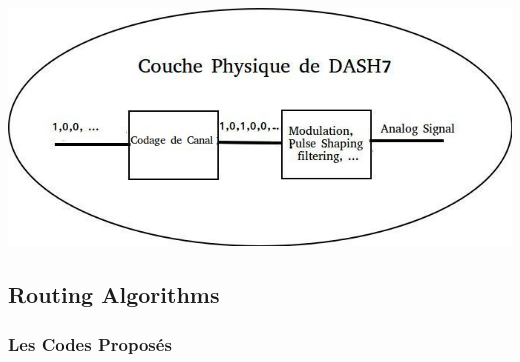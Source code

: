 \documentclass[8pt]{beamer}
\newcommand{\1}{\mathbbm 1}
\begin{document}
\begin{frame}
\begin{center}
\includegraphics[scale=0.48]{figures/physique.jpg}
\end{center}

\end{frame}

\subsection{Routing Algorithms}

\subsubsection{Les Codes Proposés}
\end{document}
